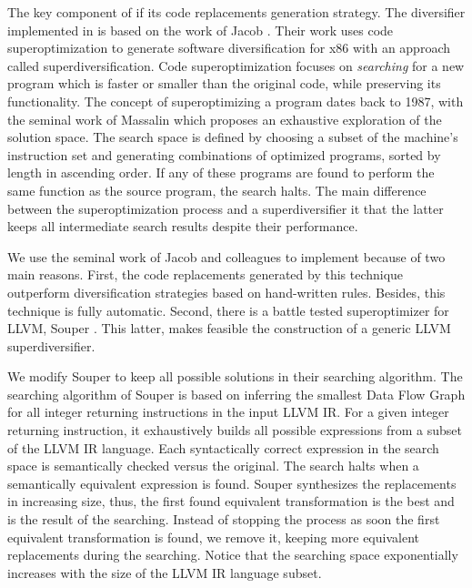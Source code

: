 
The key component of if its code replacements generation strategy. The diversifier implemented in is based on the work of Jacob \etal \cite{jacob2008superdiversifier}. Their work uses code superoptimization to generate software diversification for x86 with an approach called superdiversification. 
Code superoptimization focuses on \emph{searching} for a new program which is faster or smaller than the original code, while preserving its functionality.
The concept of superoptimizing a program dates back to 1987, with the seminal work of Massalin \cite{Massalin1987} which proposes an exhaustive exploration of the solution space. The search space is defined by choosing a subset of the machine's instruction set and generating combinations of optimized programs, sorted by length in ascending order. If any of these programs are found to perform the same function as the source program, the search halts. The main difference between the superoptimization process and a superdiversifier it that the latter keeps all intermediate search results despite their performance. 

We use the seminal work of Jacob and colleagues to implement because of two main reasons.
First, the code replacements generated by this technique outperform diversification strategies based on hand-written rules. Besides, this technique is fully automatic.
Second, there is a battle tested superoptimizer for LLVM, Souper \cite{Sasnauskas2017Souper:Superoptimizer}. This latter, makes feasible the construction of a generic LLVM superdiversifier.

We modify Souper to keep all possible solutions in their searching algorithm. The searching algorithm of Souper is based on inferring the smallest Data Flow Graph for all integer returning instructions in the input LLVM IR. For a given integer returning instruction, it exhaustively builds all possible expressions from a subset of the LLVM IR language.
Each syntactically correct expression in the search space is semantically checked versus the original. The search halts when a semantically equivalent expression is found. Souper synthesizes the replacements in increasing size, thus, the first found equivalent transformation is the best and is the result of the searching. Instead of stopping the process as soon the first equivalent transformation is found, we remove it, keeping more equivalent replacements during the searching. Notice that the searching space exponentially increases with the size of the LLVM IR language subset.

